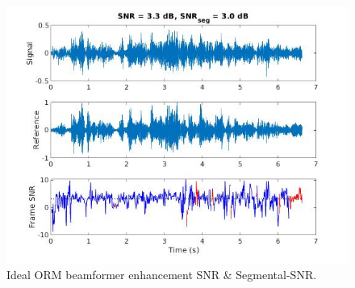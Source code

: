 \begin{figure}[H]
    \centering
    \includegraphics[width=\linewidth]{Features/images/orm_ideal_snr}
    \caption{Ideal ORM beamformer enhancement SNR \& Segmental-SNR.}\label{fig:orm_ideal_snr}
\end{figure}




